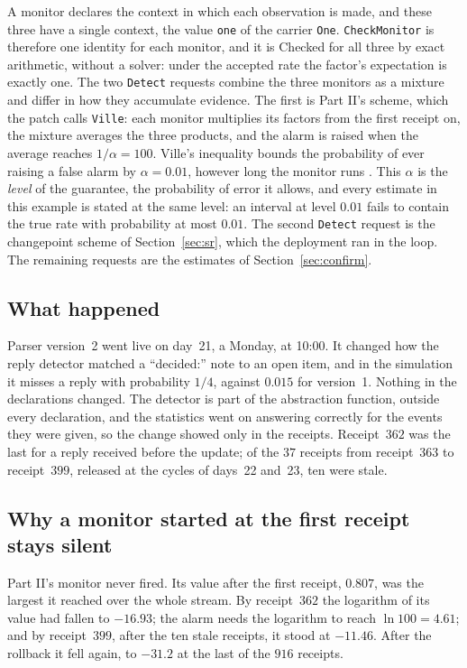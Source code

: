 \documentclass[11pt]{article}
\newcommand{\code}[1]{\texttt{#1}}
\theoremstyle{definition}
\theoremstyle{plain}
\begin{document}
A monitor declares the context in which each observation is made, and these three have a single
context, the value \code{one} of the carrier \code{One}. \code{CheckMonitor} is therefore one
identity for each monitor, and it is Checked for all three by exact arithmetic, without a solver:
under the accepted rate the factor's expectation is exactly one. The two \code{Detect} requests combine the three monitors as a mixture
and differ in how they accumulate evidence. The first is Part II's scheme, which the patch calls
\code{Ville}: each monitor multiplies its factors from the first receipt on, the mixture averages
the three products, and the alarm is raised when the average reaches $1/\alpha=100$. Ville's
inequality bounds the probability of ever raising a false alarm by $\alpha=0.01$, however long the
monitor runs \cite{ville,ramdas}. This $\alpha$ is the \emph{level} of the guarantee, the
probability of error it allows, and every estimate in this example is stated at the same level: an
interval at level $0.01$ fails to contain the true rate with probability at most $0.01$. The second
\code{Detect} request is the changepoint scheme of Section~\ref{sec:sr}, which the deployment ran in
the loop. The remaining requests are the estimates of Section~\ref{sec:confirm}.

\subsection{What happened}\label{sec:happened}

Parser version~2 went live on day~21, a Monday, at 10:00. It changed how the reply detector matched
a ``decided:'' note to an open item, and in the simulation it misses a reply with probability
$1/4$, against $0.015$ for version~1. Nothing in the declarations changed. The detector is part of
the abstraction function, outside every declaration, and the statistics went on answering correctly
for the events they were given, so the change showed only in the receipts. Receipt~$362$ was the
last for a reply received before the update; of the $37$ receipts from receipt~$363$ to
receipt~$399$, released at the cycles of days~22 and~23, ten were stale.

\subsection{Why a monitor started at the first receipt stays silent}\label{sec:debt}

Part II's monitor never fired. Its value after the first receipt, $0.807$, was the largest it
reached over the whole stream. By receipt~$362$ the logarithm of its value had fallen to $-16.93$;
the alarm needs the logarithm to reach $\ln 100=4.61$; and by receipt~$399$, after the ten stale
receipts, it stood at $-11.46$. After the rollback it fell again, to $-31.2$ at the last of the
$916$ receipts.
\end{document}
